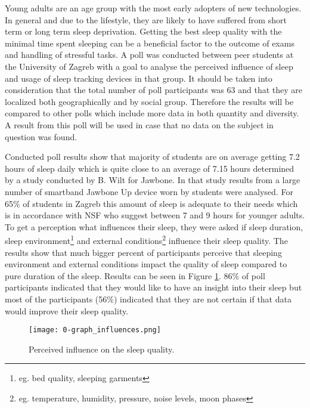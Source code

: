 Young adults are an age group with the most early adopters of new technologies. In general and due to the lifestyle, they are likely to have suffered from short term or long term sleep deprivation. Getting the best sleep quality with the minimal time spent sleeping can be a beneficial factor to the outcome of exams and handling of stressful tasks. A poll was conducted between peer students at the University of Zagreb with a goal to analyse the perceived influence of sleep and usage of sleep tracking devices in that group. It should be taken into consideration that the total number of poll participants was 63 and that they are localized both geographically and by social group. Therefore the results will be compared to other polls which include more data in both quantity and diversity. A result from this poll will be used in case that no data on the subject in question was found.

Conducted poll results show that majority of students are on average getting 7.2 hours of sleep daily which is quite close to an average of 7.15 hours determined by a study conducted by B. Wilt for Jawbone\cite{Jawbone}. In that study results from a large number of smartband Jawbone Up device worn by students were analysed. For 65\% of students in Zagreb this amount of sleep is adequate to their needs which is in accordance with NSF who suggest between 7 and 9 hours for younger adults\cite{NSF}. To get a perception what influences their sleep, they were asked if sleep duration, sleep environment\footnote{eg. bed quality, sleeping garments} and external conditions\footnote{eg. temperature, humidity, pressure, noise levels, moon phases} influence their sleep quality. The results show that much bigger percent of participants perceive that sleeping environment and external conditions impact the quality of sleep compared to pure duration of the sleep. Results can be seen in Figure \ref{fig:influence}. 86\% of poll participants indicated that they would like to have an insight into their sleep but most of the participants (56\%) indicated that they are not certain if that data would improve their sleep quality.

\begin{figure}[h]
  \begin{center}
    \texttt{[image: 0-graph\_influences.png]}
  \end{center}
  \caption{Perceived influence on the sleep quality.}
  \label{fig:influence}
\end{figure}

